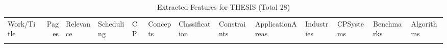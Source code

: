 {\scriptsize
\begin{longtable}{>{\raggedright\arraybackslash}p{3cm}r>{\raggedright\arraybackslash}p{1.0cm}>{\raggedright\arraybackslash}p{ 1.50cm}>{\raggedright\arraybackslash}p{ 1.50cm}>{\raggedright\arraybackslash}p{ 1.50cm}>{\raggedright\arraybackslash}p{ 1.50cm}>{\raggedright\arraybackslash}p{ 1.50cm}>{\raggedright\arraybackslash}p{ 1.50cm}>{\raggedright\arraybackslash}p{ 1.50cm}>{\raggedright\arraybackslash}p{ 1.50cm}>{\raggedright\arraybackslash}p{ 1.50cm}>{\raggedright\arraybackslash}p{ 1.50cm}}
\rowcolor{white}\caption{Extracted Features for THESIS (Total 28)}\\ \toprule
\rowcolor{white}Work/Title & Pages & Relevance & Scheduling& CP& Concepts& Classification& Constraints& ApplicationAreas& Industries& CPSystems& Benchmarks& Algorithms\\ \midrule\endhead
\bottomrule
\endfoot

\end{longtable}}
